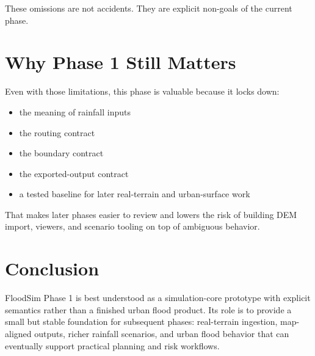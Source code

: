 \documentclass[10pt]{article}
\begin{document}
These omissions are not accidents. They are explicit non-goals of the current phase.

\section{Why Phase 1 Still Matters}

Even with those limitations, this phase is valuable because it locks down:

\begin{itemize}
    \item the meaning of rainfall inputs
    \item the routing contract
    \item the boundary contract
    \item the exported-output contract
    \item a tested baseline for later real-terrain and urban-surface work
\end{itemize}

That makes later phases easier to review and lowers the risk of building DEM import, viewers, and scenario tooling on top of ambiguous behavior.

\section{Conclusion}

FloodSim Phase 1 is best understood as a simulation-core prototype with explicit semantics rather than a finished urban flood product. Its role is to provide a small but stable foundation for subsequent phases: real-terrain ingestion, map-aligned outputs, richer rainfall scenarios, and urban flood behavior that can eventually support practical planning and risk workflows.
\end{document}

